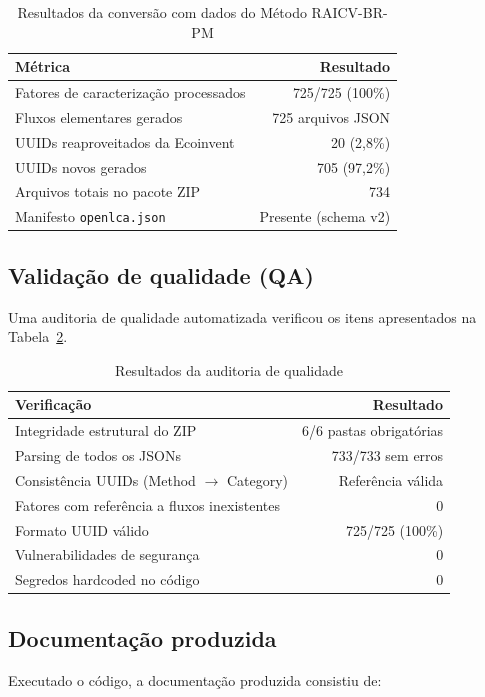 \begin{table}[H]
\centering
\caption{Resultados da convers\~ao com dados do Método RAICV-BR-PM}
\label{tab:resconver} 
\begin{tabular}{lr}
\toprule
\textbf{M\'etrica} & \textbf{Resultado} \\
\midrule
Fatores de caracteriza\c{c}\~ao processados & 725/725 (100\%) \\
Fluxos elementares gerados & 725 arquivos JSON \\
UUIDs reaproveitados da Ecoinvent & 20 (2,8\%) \\
UUIDs novos gerados & 705 (97,2\%) \\
Arquivos totais no pacote ZIP & 734 \\
Manifesto \texttt{openlca.json} & Presente (schema v2) \\
\bottomrule
\end{tabular}
\end{table}



\subsection{Valida\c{c}\~ao de qualidade (QA)}

Uma auditoria de qualidade automatizada verificou os itens apresentados na Tabela~\ref{tab:audit}.

\begin{table}[H]
\centering
\caption{Resultados da auditoria de qualidade}
\label{tab:audit}
\begin{tabular}{lr}
\toprule
\textbf{Verifica\c{c}\~ao} & \textbf{Resultado} \\
\midrule
Integridade estrutural do ZIP & 6/6 pastas obrigat\'orias \\
Parsing de todos os JSONs & 733/733 sem erros \\
Consist\^encia UUIDs (Method $\rightarrow$ Category) & Refer\^encia v\'alida \\
Fatores com refer\^encia a fluxos inexistentes & 0 \\
Formato UUID v\'alido & 725/725 (100\%) \\
Vulnerabilidades de seguran\c{c}a & 0 \\
Segredos hardcoded no c\'odigo & 0 \\
\bottomrule
\end{tabular}
\end{table}

\subsection{Documenta\c{c}\~ao produzida}
Executado o código, a documentação produzida consistiu de:

